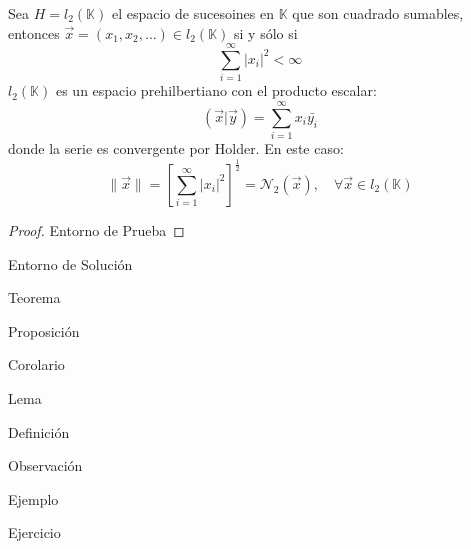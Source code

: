 \documentclass[12pt]{report}
\theoremstyle{largebreak}
\begin{document}
    \begin{exa}
        Sea $H=l_2(\mathbb{K})$ el espacio de sucesoines en $\mathbb{K}$ que son cuadrado sumables, entonces $\overrightarrow{x}=(x_1,x_2,...)\in l_2(\mathbb{K})$ si y sólo si
        \begin{equation*}
            \sum_{i=1}^{\infty}|x_i|^2<\infty
        \end{equation*}
        $l_2(\mathbb{K})$ es un espacio prehilbertiano con el producto escalar:
        \begin{equation*}
            (\overrightarrow{x}\big| \overrightarrow{y})=\sum_{i=1}^{\infty}x_i\bar{y_i}
        \end{equation*}
        donde la serie es convergente por Holder. En este caso:
        \begin{equation}
            \|\overrightarrow{x} \|=\left[\sum_{i=1}^{\infty}|x_i|^2\right]^{\frac{1}{2}}=\mathcal{N}_2(\overrightarrow{x}),\quad\forall\overrightarrow{x}\in l_2(\mathbb{K})
        \end{equation}
    \end{exa}

    \newpage

    \begin{proof}
        Entorno de Prueba
    \end{proof}

    \begin{sol}
        Entorno de Solución
    \end{sol}

    \begin{theor}[Nombre]
        Teorema
    \end{theor}

    \begin{propo}[Nombre]
        Proposición
    \end{propo}

    \begin{cor}[Nombre]
        Corolario
    \end{cor}

    \begin{lema}[Nombre]
        Lema
    \end{lema}

    \begin{mydef}[Nombre]
        Definición
    \end{mydef}

    \begin{obs}[Nombre]
        Observación
    \end{obs}

    \begin{exa}[Nombre]
        Ejemplo
    \end{exa}

    \begin{excer}[Nombre]
        Ejercicio
    \end{excer}
\end{document}
